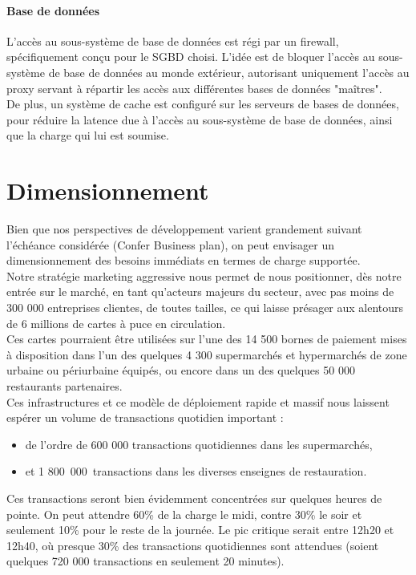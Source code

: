 \paragraph{Base de données}

L'accès au sous-système de base de données est régi par un firewall,
spécifiquement conçu pour le SGBD choisi. L'idée est de bloquer l'accès au
sous-système de base de données au monde extérieur, autorisant uniquement
l'accès au proxy servant à répartir les accès aux différentes bases de données
"maîtres". \\

De plus, un système de cache est configuré sur les serveurs de bases de données,
pour réduire la latence due à l'accès au sous-système de base de données, ainsi que
la charge qui lui est soumise.

\section{Dimensionnement}
\label{sec:Dimensionnement}

Bien que nos perspectives de développement varient grandement suivant l'échéance
considérée (Confer Business plan), on peut envisager un dimensionnement 
des besoins immédiats en termes de charge supportée. \\
Notre stratégie marketing aggressive nous permet de nous positionner, dès notre 
entrée sur le marché, en tant qu'acteurs majeurs du secteur, avec pas moins de 
300 000 entreprises clientes, de toutes tailles, ce qui laisse présager aux 
alentours de 6 millions de cartes à puce en circulation. \\
Ces cartes pourraient être utilisées sur l'une des 14 500 bornes de paiement mises
à disposition dans l'un des quelques 4 300 supermarchés et hypermarchés de zone
urbaine ou périurbaine équipés, ou encore dans un des quelques 50 000 restaurants
partenaires. \\
Ces infrastructures et ce modèle de déploiement rapide et massif nous laissent 
espérer un volume de transactions quotidien important :
\begin{itemize}
	\item de l'ordre de 600 000 transactions quotidiennes dans les supermarchés,
	\item et 1 800 000 transactions dans les diverses enseignes de restauration.
\end{itemize}
Ces transactions seront bien évidemment concentrées sur quelques heures de pointe.
On peut attendre 60\% de la charge le midi, contre 30\% le soir et seulement 10\% 
pour le reste de la journée. Le pic critique serait entre 12h20 et 12h40, où 
presque 30\% des transactions quotidiennes sont attendues (soient quelques 
720 000 transactions en seulement 20 minutes). \\

